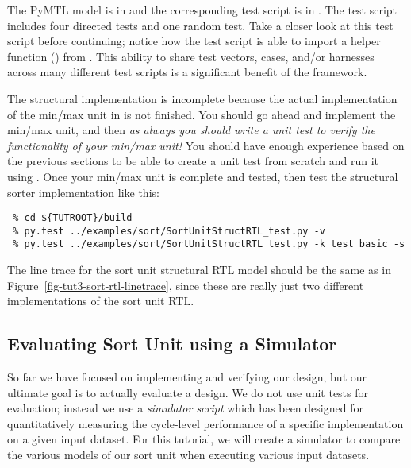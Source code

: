 \documentclass{cbxdoc}
\begin{document}
The PyMTL model is in  and the corresponding
test script is in \linebreak {}. The test
script includes four directed tests and one random test. Take a closer
look at this test script before continuing; notice how the test script is
able to import a helper function () from
. This ability to share test vectors, cases,
and/or harnesses across many different test scripts is a significant
benefit of the  framework.

\clearpage

\vspace*{-0.25in}
\begin{task}
  The structural implementation is incomplete because the actual
  implementation of the min/max unit in  is not
  finished. You should go ahead and implement the min/max unit, and then
  \emph{as always you should write a unit test to verify the
    functionality of your min/max unit!} You should have enough
  experience based on the previous sections to be able to create a unit
  test from scratch and run it using . Once your min/max unit
  is complete and tested, then test the structural sorter implementation
  like this:

\begin{verbatim}
 % cd ${TUTROOT}/build
 % py.test ../examples/sort/SortUnitStructRTL_test.py -v
 % py.test ../examples/sort/SortUnitStructRTL_test.py -k test_basic -s
\end{verbatim}

  The line trace for the sort unit structural RTL model should be the
  same as in Figure~\ref{fig-tut3-sort-rtl-linetrace}, since these are
  really just two different implementations of the sort unit RTL.

\end{task}

\subsection{Evaluating Sort Unit using a Simulator}

So far we have focused on implementing and verifying our design, but our
ultimate goal is to actually evaluate a design. We do not use unit tests
for evaluation; instead we use a \emph{simulator script} which has been
designed for quantitatively measuring the cycle-level performance of a
specific implementation on a given input dataset. For this tutorial, we
will create a simulator to compare the various models of our sort unit
when executing various input datasets.
\end{document}
